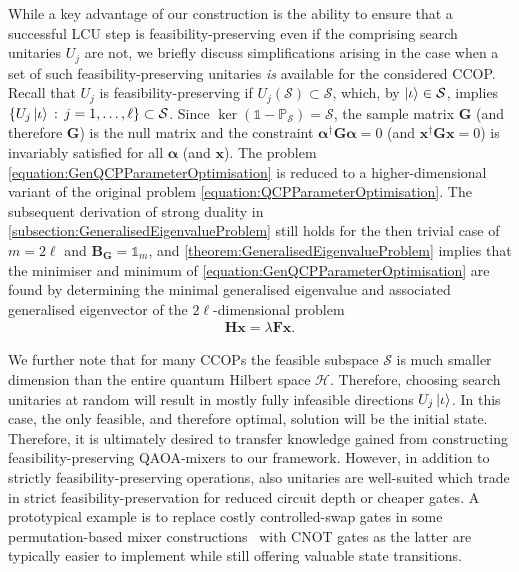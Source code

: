 \documentclass[10pt,conference]{IEEEtran}
\newcommand*{\hil}{\mathcal{H}}       %
\newcommand*{\defcolon}{\,:\,}        %
\newcommand*{\solspace}{\mathcal{S}}  %
\newcommand*{\one}{\mathds{1}}        %
\newcommand*{\projection}{\mathds{P}} %
\begin{document}
While a key advantage of our construction is the ability to ensure that a successful LCU step is feasibility-preserving even if the comprising search unitaries $U_j$ are not, we briefly discuss simplifications arising in the case when a set of such feasibility-preserving unitaries \emph{is} available for the considered CCOP.
Recall that $U_j$ is feasibility-preserving if $U_j(\solspace) \subset \solspace$, which, by $\ket{\iota} \in \solspace$, implies $\{U_{j} \ket{\iota} \defcolon j = 1, \ldots, \ell\} \subset \solspace$.
Since $\ker(\one - \projection_{\solspace}) = \solspace$, the sample matrix $\mathbf{G}$ (and therefore $\bm{G}$) is the null matrix and the constraint $\bm{\alpha}^\dagger \mathbf{G} \bm{\alpha} = 0$ (and $\bm{x}^\dagger \bm{G} \bm{x} = 0$) is invariably satisfied for all $\bm{\alpha}$ (and $\bm{x}$).
The problem \eqref{equation:GenQCPParameterOptimisation} is reduced to a higher-dimensional variant of the original problem \eqref{equation:QCPParameterOptimisation}.
The subsequent derivation of strong duality in \autoref{subsection:GeneralisedEigenvalueProblem} still holds for the then trivial case of $m = 2 \ell$ and $\bm{B}_{\bm{G}} = \one_m$, and \autoref{theorem:GeneralisedEigenvalueProblem} implies that the minimiser and minimum of \eqref{equation:GenQCPParameterOptimisation} are found by determining the minimal generalised eigenvalue and associated generalised eigenvector of the $2 \ell$-dimensional problem
\begin{align}
    \bm{H} \bm{x} = \lambda \bm{F} \bm{x}.
\end{align}

We further note that for many CCOPs the feasible subspace $\solspace$ is much smaller dimension than the entire quantum Hilbert space $\hil$.
Therefore, choosing search unitaries at random will result in mostly fully infeasible directions $U_{j} \ket{\iota}$.
In this case, the only feasible, and therefore optimal, solution will be the initial state.
Therefore, it is ultimately desired to transfer knowledge gained from constructing feasibility-preserving QAOA-mixers to our framework.
However, in addition to strictly feasibility-preserving operations, also unitaries are well-suited which trade in strict feasibility-preservation for reduced circuit depth or cheaper gates.
A prototypical example is to replace costly controlled-swap gates in some permutation-based mixer constructions~\cite{Binkowski2025SymmetryBasedQuantumAlgorithmsForOpenShopSchedulingWithHardConstraints} with CNOT gates as the latter are typically easier to implement while still offering valuable state transitions.
\end{document}
